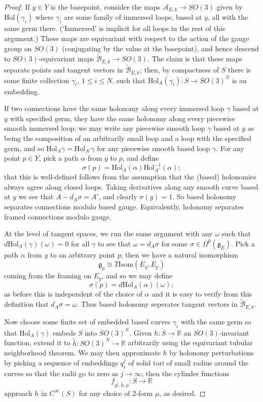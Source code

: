 \documentclass{memo-l}
\theoremstyle{definition}
\theoremstyle{remark}
\numberwithin{section}{chapter}
\numberwithin{equation}{chapter}
\begin{document}
\begin{proof}
If $y \in Y$ is the basepoint, consider the maps $\mathcal A_{E,k} \to SO(3)$ given by $\text{Hol}(\gamma_i)$ where $\gamma_i$ are some family of immersed loops, based at $y$, all with the same germ there. (`Immersed' is implicit for all loops in the rest of this argument.) These maps are equivariant with respect to the action of the gauge group on $SO(3)$ (conjugating by the value at the basepoint), and hence descend to $SO(3)$-equivariant maps $\widetilde{\mathcal B}_{E,k} \to SO(3)$. The claim is that these maps separate points and tangent vectors in $\widetilde{\mathcal B}_{E,k}$; then, by compactness of $S$ there is some finite collection $\gamma_i$, $1 \leq i \leq N$, such that $\text{Hol}_A(\gamma_i): S \to SO(3)^N$ is an embedding.

If two connections have the same holonomy along every immersed loop $\gamma$ based at $y$ with specified germ, they have the same holonomy along every piecewise smooth immersed loop: we may write any piecewise smooth loop $\gamma$ based at $y$ as being the composition of an arbitrarily small loop and a loop with the specified germ, and so $\text{Hol}_A \gamma = \text{Hol}_{A'} \gamma$ for any piecewise smooth based loop $\gamma$. For any point $p \in Y$, pick a path $\alpha$ from $y$ to $p$, and define 
$$\sigma(p) = \text{Hol}_{A}(\alpha) \text{Hol}_{A'}^{-1}(\alpha);$$ 
that this is well-defined follows from the assumption that the (based) holonomies always agree along closed loops. Taking derivatives along any smooth curve based at $y$ we see that $A - d_A \sigma = A'$, and clearly $\sigma(y) = 1$. So based holonomy separates connections modulo based gauge. Equivalently, holonomy separates framed connections modulo gauge.

At the level of tangent spaces, we run the same argument with any $\omega$ such that $d\text{Hol}_A (\gamma)(\omega) = 0$ for all $\gamma$ to see that $\omega = d_A \sigma$ for some $\sigma \in \Omega^0(\mathfrak g_E)$. Pick a path $\alpha$ from $y$ to an arbitrary point $p$; then we have a natural isomorphism 
$$\mathfrak g_p \cong T\text{Isom}(E_y, E_p)$$
coming from the framing on $E_y$, and so we may define 
$$\sigma(p) = d\text{Hol}_A(\alpha)(\omega);$$ 
as before this is independent of the choice of $\alpha$ and it is easy to verify from this definition that $d_A \sigma = \omega$. Thus based holonomy seperates tangent vectors in $\widetilde{\mathcal B}_{E,k}$.

Now choose some finite set of embedded based curves $\gamma_i$ with the same germ so that $\text{Hol}_A(\gamma)$ embeds $S$ into $SO(3)^N$. Given $h: S \to \mathbb R$ an $SO(3)$-invariant function, extend it to $\tilde h: SO(3)^N \to \mathbb R$ arbitrarily using the equivariant tubular neighborhood theorem. We may then approximate $h$ by holonomy perturbations by picking a sequence of embeddings $q_i^j$ of solid tori of small radius around the curves so that the radii go to zero as $j \to \infty$; then the cylinder functions 
$$f_{q^j,\tilde h, \mu}: S \to \mathbb R$$ 
approach $h$ in $C^\infty(S)$ for any choice of 2-form $\mu$, as desired.


\end{proof}
\end{document}
